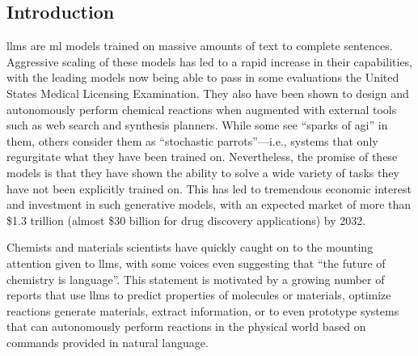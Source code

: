 \documentclass[11pt, oneside]{article}
\begin{document}
\clearpage
\begin{refsection}
\section{Introduction}
\Glspl{llm} are \gls{ml} models trained on massive amounts of text to complete sentences. 
Aggressive scaling of these models has led to a rapid increase in their capabilities,\autocite{brown2020language,zhong2024benchmarking} with the leading models now being able to pass in some evaluations the United States Medical Licensing Examination.\autocite{kung2023performance} 
They also have been shown to design and autonomously perform chemical reactions when augmented with external tools such as web search and synthesis planners.\autocite{openai2024gpt4, Boiko_2023, bran2023chemcrow}
While some see \enquote{sparks of \gls{agi}} in them,\autocite{bubeck2023sparks} others consider them as \enquote{stochastic parrots}---i.e., systems that only regurgitate what they have been trained on.\autocite{bender2021dangers}
Nevertheless, the promise of these models is that they have shown the ability to solve a wide variety of tasks they have not been explicitly trained on.\autocite{bommasani2021opportunities, anderljung2023frontier, ai4science2023impact}
This has led to tremendous economic interest and investment in such generative models, with an expected market of more than \$1.3 trillion (almost \$30 billion for drug discovery applications) by 2032.\autocite{bloomberg}

Chemists and materials scientists have quickly caught on to the mounting attention given to \glspl{llm}, with some voices even suggesting that \enquote{the future of chemistry is language}.\autocite{White_2023}
This statement is motivated by a growing number of reports that use \glspl{llm} to predict properties of molecules or materials,\autocite{jablonka202314, jablonka2024leveraging, xie2024fine, liao2024words, zhang2024chemllm, zhong2024benchmarking}  optimize reactions\autocite{ramos2023bayesian, kristiadi2024sober}  generate materials,\autocite{rubungo2023llm, flam2023language, gruver2024fine} extract information,\autocite{Patiny_2023, Dagdelen_2024, Zheng_2024, lala2023paperqa, caufield2023structured, gupta2022discomat} or to even prototype systems that can autonomously perform reactions in the physical world based on commands provided in natural language.\autocite{bran2023chemcrow, Boiko_2023, darvish2024organa}


\end{refsection}
\end{document}
